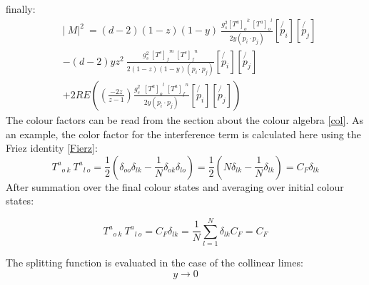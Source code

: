 finally:
\begin{equation}
\begin{split}
&\lvert\:M\lvert^2\: = (d-2)(1-z)(1-y)\:\frac{g_s^2  {[T^a]_{o}}^k \: {[T^a]_o}^l }{2y(p_i \cdot p_j)}
[\not{p_i}][\not{p_j}]\\
&-(d-2)yz^2\:\frac{g_s^2 \: {[T^c]_f}^m \: {[T^c]_{f}}^n }{2(1-z)(1-y)(p_i \cdot p_j)}
[\not{p_i}][\not{p_j}]\\
&+2RE((\frac{-2z}{z-1}) \frac{g_s^2 \:\:{[T^a]_o}^l \:{[T^a]_{f}}^n }{2y(p_i \cdot p_j)} 
[\not{p_i}][\not{p_j}])
\end{split}
\end{equation}
The colour factors can be read from the section about the colour algebra \ref{col}. As an example, the color factor for the interference term is calculated here using the Friez identity \ref{Fierz}:
\begin{equation}
{T^a}_{o\:k} \: {T^a}_{l\:o} = \frac{1}{2}(\delta_{oo}\delta_{lk}-\frac{1}{N}\delta_{ok}\delta_{lo})= \frac{1}{2}(N\delta_{lk}-\frac{1}{N}\delta_{lk})=C_F \delta_{lk}
\end{equation}
After summation over the final colour states and averaging over initial colour states:

\begin{equation}
{T^a}_{o\:k} \: {T^a}_{l\:o}=C_F \delta_{lk}=\frac{1}{N} \displaystyle\sum\limits_{l=1}^ N \delta_{lk}C_F=C_F
\end{equation}

The splitting function is evaluated in the case of the collinear limes:
\begin{equation}
y \longrightarrow 0
\end{equation}


